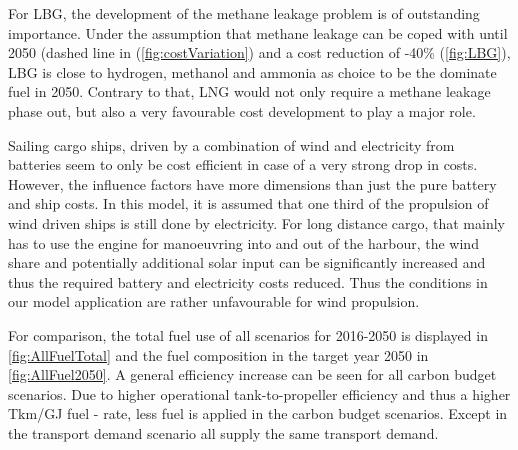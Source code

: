 \documentclass[article]{elsarticle}
\begin{document}
For LBG, the development of the methane leakage problem is of outstanding importance. Under the assumption that methane leakage can be coped with until 2050 (dashed line in (\autoref{fig:costVariation}) and a cost reduction of -40\% (\autoref{fig:LBG}), LBG is close to hydrogen, methanol and ammonia as choice to be the dominate fuel in 2050. Contrary to that, LNG would not only require a methane leakage phase out, but also a very favourable cost development to play a major role.

Sailing cargo ships, driven by a combination of wind and electricity from batteries seem to only be cost efficient in case of a very strong drop in costs. However, the influence factors have more dimensions than just the pure battery and ship costs. In this model, it is assumed that one third of the propulsion of wind driven ships is still done by electricity. For long distance cargo, that mainly has to use the engine for manoeuvring into and out of the harbour, the wind share and potentially additional solar input can be significantly increased and thus the required battery and electricity costs reduced. Thus the conditions in our model application are rather unfavourable for wind propulsion.

For comparison, the total fuel use of all scenarios for 2016-2050 is displayed in \autoref{fig:AllFuelTotal} and the fuel composition in the target year 2050 in \autoref{fig:AllFuel2050}. A general efficiency increase can be seen for all carbon budget scenarios. Due to higher operational tank-to-propeller efficiency and thus a higher Tkm/GJ fuel - rate, less fuel is applied in the carbon budget scenarios. Except in the transport demand scenario all supply the same transport demand.
\end{document}
